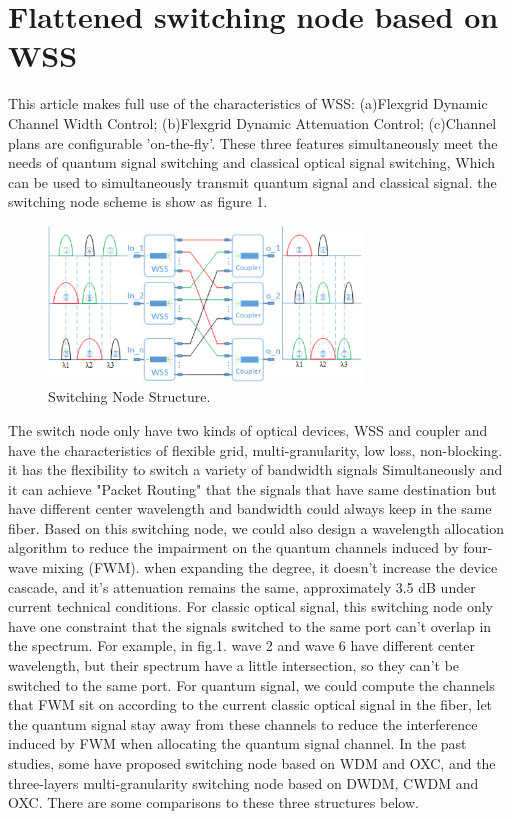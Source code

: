 \documentclass[letterpaper,10pt]{article}
\begin{document}
\section{Flattened switching node based on WSS}
This article makes full use of the characteristics of WSS: (a)Flexgrid Dynamic Channel Width Control; (b)Flexgrid Dynamic Attenuation Control; (c)Channel plans are configurable 'on-the-fly'. These three features simultaneously meet the needs of quantum signal switching and classical optical signal switching, Which can be used to simultaneously transmit quantum signal and classical signal. the switching node scheme is show as figure 1.
\begin{figure}[htbp]
  \centering
  \includegraphics[width=8.3cm]{swtiching_node_struct}
\caption{Switching Node Structure.}
\end{figure}
The switch node only have two kinds of optical devices, WSS and coupler and have the characteristics of flexible grid, multi-granularity, low loss, non-blocking. it has the flexibility to switch a variety of bandwidth signals Simultaneously and it can achieve "Packet Routing" that the signals that have same destination but have different center wavelength and bandwidth could always keep in the same fiber. Based on this switching node, we could also design a wavelength allocation algorithm to reduce the impairment on the quantum channels induced by four-wave mixing (FWM). when expanding the degree, it doesn't increase the device cascade, and it's attenuation remains the same, approximately 3.5 dB under current technical conditions.
For classic optical signal, this switching node only have one constraint that the signals switched to the same port can't overlap in the spectrum. For example, in fig.1. wave 2 and wave 6 have different center wavelength, but their spectrum have a little intersection, so they can't be switched to the same port. For quantum signal, we could compute the channels that FWM sit on according to the current classic optical signal in the fiber, let the quantum signal stay away from these channels to reduce the interference induced by FWM when allocating the quantum signal channel. In the past studies, some have proposed switching node based on WDM and OXC, and the three-layers multi-granularity switching node based on DWDM, CWDM and OXC. There are some comparisons to these three structures below.
\end{document}
